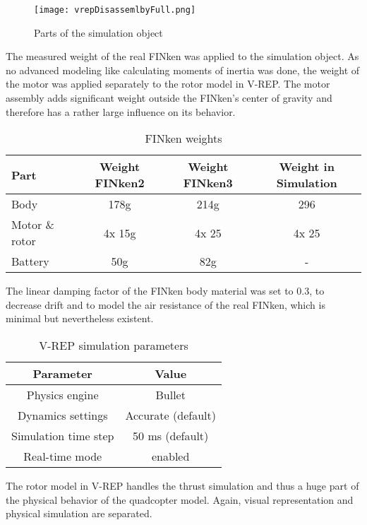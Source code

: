 \begin{figure}[h!]
 \begin{center}
  \texttt{[image: vrepDisassemlbyFull.png]}
 \end{center}
  \caption{Parts of the simulation object \label{fig:vrepParts}}
\end{figure}

The measured weight of the real FINken was applied to the simulation object. 
As no advanced modeling like calculating moments of inertia was done, the weight of the motor was applied separately to the rotor model in V-REP.  The motor assembly adds significant weight outside the FINken's center of gravity and therefore has a rather large influence on its behavior. 


\begin{table}[h]
	\centering
	\begin{tabular}{|l|c|c|c|}
    		\hline
		Part & Weight FINken2 & Weight FINken3 & Weight in Simulation \\
		\hline
    		Body & 178g &  214g & 296\\
    		\hline
		Motor \& rotor & 4x 15g & 4x 25 & 4x 25\\
    		\hline
		Battery & 50g & 82g & - \\
    		\hline
	\end{tabular}
    	\caption{FINken weights}
      	\label{tab:finkWeight}
\end{table}

The linear damping factor of the FINken body material was set to 0.3, to decrease drift and to model the air resistance of the real FINken, which is minimal but nevertheless existent.

\begin{table}[h]
	\centering
	\begin{tabular}{|c|c|}
    		\hline
		Parameter & Value \\
		\hline
    		Physics engine & Bullet\\
    		\hline
    		Dynamics settings & Accurate (default) \\
    		\hline
    		Simulation time step & 50 ms (default) \\
    		\hline
    		Real-time mode & enabled \\
    		\hline
	\end{tabular}
    	\caption{V-REP simulation parameters}
      	\label{tab:simSettings}
\end{table}

The rotor model in V-REP handles the thrust simulation and thus a huge part of the physical behavior of the quadcopter model.  
Again, visual representation and physical simulation are separated. 

